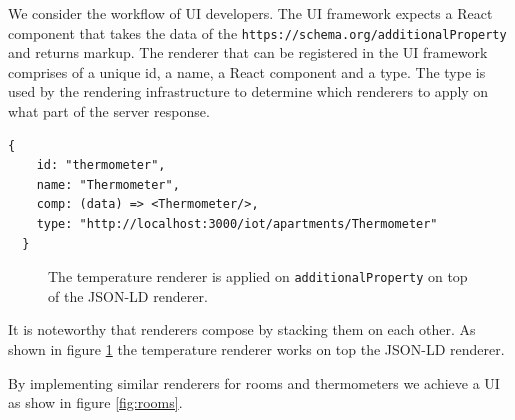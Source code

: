 We consider the workflow of UI developers. The UI framework expects a React component that takes the data of the \lstinline{https://schema.org/additionalProperty} and returns markup. The renderer that can be registered in the UI framework comprises of a unique id, a name, a React component and a type. The type is used by the rendering infrastructure to determine which renderers to apply on what part of the server response.

\lstset{language=JSON}
\begin{lstlisting}[caption=Renderer configuration that the developer provides.]
  {
    id: "thermometer",
    name: "Thermometer",
    comp: (data) => <Thermometer/>,
    type: "http://localhost:3000/iot/apartments/Thermometer"
  }
\end{lstlisting}

\begin{figure}[!htb]
  \caption{The temperature renderer is applied on \lstinline{additionalProperty} on top of the JSON-LD renderer.}
  \label{fig:temperature}
\end{figure}

It is noteworthy that renderers compose by stacking them on each other. As shown in figure \ref{fig:temperature} the temperature renderer works on top the JSON-LD renderer.

By implementing similar renderers for rooms and thermometers we achieve a UI as show in figure \ref{fig:rooms}.

